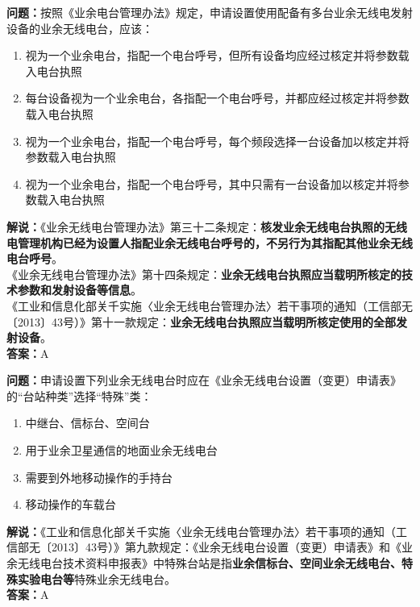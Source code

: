 \bigskip


\noindent\textbf{问题：}按照《业余电台管理办法》规定，申请设置使用配备有多台业余无线电发射设备的业余无线电台，应该：
\begin{enumerate}[label=\Alph*), leftmargin=3em]
\item 视为一个业余电台，指配一个电台呼号，但所有设备均应经过核定并将参数载入电台执照
\item 每台设备视为一个业余电台，各指配一个电台呼号，并都应经过核定并将参数载入电台执照
\item 视为一个业余电台，指配一个电台呼号，每个频段选择一台设备加以核定并将参数载入电台执照
\item 视为一个业余电台，指配一个电台呼号，其中只需有一台设备加以核定并将参数载入电台执照
\end{enumerate}
\noindent\textbf{解说：}《业余无线电台管理办法》第三十二条规定：\textbf{核发业余无线电台执照的无线电管理机构已经为设置人指配业余无线电台呼号的，不另行为其指配其他业余无线电台呼号}。\\
《业余无线电台管理办法》第十四条规定：\textbf{业余无线电台执照应当载明所核定的技术参数和发射设备等信息}。\\
《工业和信息化部关千实施〈业余无线电台管理办法〉若干事项的通知（工信部无〔2013〕43号）》第十一款规定：\textbf{业余无线电台执照应当载明所核定使用的全部发射设备}。\\\noindent\textbf{答案：}A


\bigskip


\noindent\textbf{问题：}申请设置下列业余无线电台时应在《业余无线电台设置（变更）申请表》 的“台站种类”选择“特殊”类：
\begin{enumerate}[label=\Alph*), leftmargin=3em]
\item 中继台、信标台、空间台
\item 用于业余卫星通信的地面业余无线电台
\item 需要到外地移动操作的手持台
\item 移动操作的车载台
\end{enumerate}
\noindent\textbf{解说：}《工业和信息化部关千实施〈业余无线电台管理办法〉若干事项的通知（工信部无〔2013〕43号）》第九款规定：《业余无线电台设置（变更）申请表》和《业余无线电台技术资料申报表》中特殊台站是指\textbf{业余信标台、空间业余无线电台、特殊实验电台等}特殊业余无线电台。\\\noindent\textbf{答案：}A%


\bigskip


